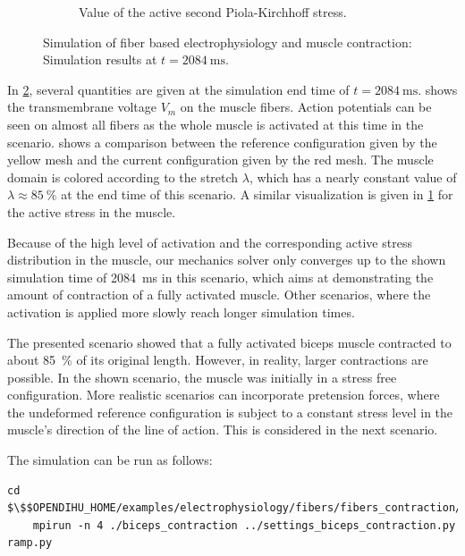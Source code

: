 \begin{figure}
\begin{subfigure}[t]{0.31\textwidth}
    \caption{Value of the active second Piola-Kirchhoff stress.}%
    \label{fig:contraction_active_stress}%
  \end{subfigure}
  \caption{Simulation of fiber based electrophysiology and muscle contraction: Simulation results at $t=\SI{2084}{\ms}$.}%
  \label{fig:contraction_at_end}%
\end{figure}%

In \cref{fig:contraction_at_end}, several quantities are given at the simulation end time of $t=\SI{2084}{\ms}$.  shows the transmembrane voltage $V_m$ on the muscle fibers. Action potentials can be seen on almost all fibers as the whole muscle is activated at this time in the scenario.  shows a comparison between the reference configuration given by the yellow mesh and the current configuration given by the red mesh. The muscle domain is colored according to the stretch $\lambda$, which has a nearly constant value of $\lambda \approx \SI{85}{\percent}$ at the end time of this scenario. A similar visualization is given in \cref{fig:contraction_active_stress} for the active stress in the muscle.

Because of the high level of activation and the corresponding active stress distribution in the muscle, our mechanics solver only converges up to the shown simulation time of \SI{2084}{\ms} in this scenario, which aims at demonstrating the amount of contraction of a fully activated muscle. Other scenarios, where the activation is applied more slowly reach longer simulation times.

The presented scenario showed that a fully activated biceps muscle contracted to about \SI{85}{\percent} of its original length. However, in reality, larger contractions are possible. In the shown scenario, the muscle was initially in a stress free configuration. More realistic scenarios can incorporate pretension forces, where the undeformed reference configuration is subject to a constant stress level in the muscle's direction of the line of action. This is considered in the next scenario.


\begin{reproduce_no_break}
  The simulation can be run as follows:
  \begin{lstlisting}[columns=fullflexible,breaklines=true,postbreak=\mbox{\textcolor{gray}{$\hookrightarrow$}\space}]
    cd $\$$OPENDIHU_HOME/examples/electrophysiology/fibers/fibers_contraction/no_precice/build_release
    mpirun -n 4 ./biceps_contraction ../settings_biceps_contraction.py ramp.py
  \end{lstlisting}
\end{reproduce_no_break}

